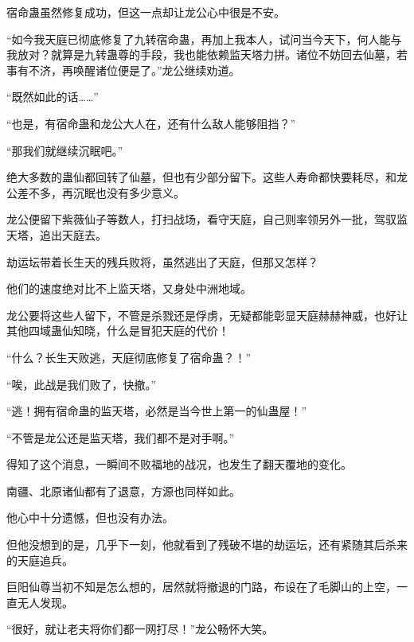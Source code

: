 \begin{this_body}
宿命蛊虽然修复成功，但这一点却让龙公心中很是不安。

“如今我天庭已彻底修复了九转宿命蛊，再加上我本人，试问当今天下，何人能与我放对？就算是九转蛊尊的手段，我也能依赖监天塔力拼。诸位不妨回去仙墓，若事有不济，再唤醒诸位便是了。”龙公继续劝道。

“既然如此的话……”

“也是，有宿命蛊和龙公大人在，还有什么敌人能够阻挡？”

“那我们就继续沉眠吧。”

绝大多数的蛊仙都回转了仙墓，但也有少部分留下。这些人寿命都快要耗尽，和龙公差不多，再沉眠也没有多少意义。

龙公便留下紫薇仙子等数人，打扫战场，看守天庭，自己则率领另外一批，驾驭监天塔，追出天庭去。

劫运坛带着长生天的残兵败将，虽然逃出了天庭，但那又怎样？

他们的速度绝对比不上监天塔，又身处中洲地域。

龙公要将这些人留下，不管是杀戮还是俘虏，无疑都能彰显天庭赫赫神威，也好让其他四域蛊仙知晓，什么是冒犯天庭的代价！

“什么？长生天败逃，天庭彻底修复了宿命蛊？！”

“唉，此战是我们败了，快撤。”

“逃！拥有宿命蛊的监天塔，必然是当今世上第一的仙蛊屋！”

“不管是龙公还是监天塔，我们都不是对手啊。”

得知了这个消息，一瞬间不败福地的战况，也发生了翻天覆地的变化。

南疆、北原诸仙都有了退意，方源也同样如此。

他心中十分遗憾，但也没有办法。

但他没想到的是，几乎下一刻，他就看到了残破不堪的劫运坛，还有紧随其后杀来的天庭追兵。

巨阳仙尊当初不知是怎么想的，居然就将撤退的门路，布设在了毛脚山的上空，一直无人发现。

“很好，就让老夫将你们都一网打尽！”龙公畅怀大笑。

\end{this_body}

